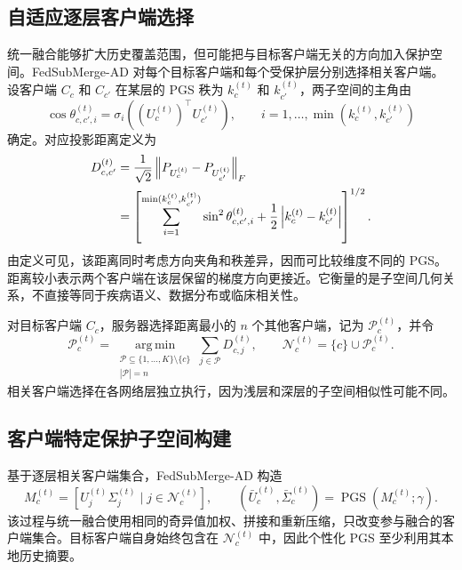 \subsection{自适应逐层客户端选择}
\label{subsec:fedsubmerge-adaptive-selection}

统一融合能够扩大历史覆盖范围，但可能把与目标客户端无关的方向加入保护空间。FedSubMerge-AD 对每个目标客户端和每个受保护层分别选择相关客户端。设客户端 $C_c$ 和 $C_{c'}$ 在某层的 PGS 秩为 $k_c^{(t)}$ 和 $k_{c'}^{(t)}$，两子空间的主角由
\begin{equation}
\cos\theta_{c,c',i}^{(t)}
=
\sigma_i\!\left((U_c^{(t)})^{\top}U_{c'}^{(t)}\right),
\qquad
 i=1,\ldots,\min(k_c^{(t)},k_{c'}^{(t)})
\label{eq:fedsubmerge-principal-angle}
\end{equation}
确定。对应投影距离定义为
\begin{align}
D_{c,c'}^{(t)}
&=
\frac{1}{\sqrt{2}}
\left\|P_{U_c^{(t)}}-P_{U_{c'}^{(t)}}\right\|_F
\notag\\
&=
\left[
\sum_{i=1}^{\min(k_c^{(t)},k_{c'}^{(t)})}
\sin^2\theta_{c,c',i}^{(t)}
+
\frac{1}{2}\left|k_c^{(t)}-k_{c'}^{(t)}\right|
\right]^{1/2}.
\label{eq:fedsubmerge-subspace-distance}
\end{align}
由定义可见，该距离同时考虑方向夹角和秩差异，因而可比较维度不同的 PGS。距离较小表示两个客户端在该层保留的梯度方向更接近。它衡量的是子空间几何关系，不直接等同于疾病语义、数据分布或临床相关性。

对目标客户端 $C_c$，服务器选择距离最小的 $n$ 个其他客户端，记为 $\mathcal{P}_c^{(t)}$，并令
\begin{equation}
\mathcal{P}_c^{(t)}
=
\operatorname*{arg\,min}_{
\substack{\mathcal{P}\subseteq\{1,\ldots,K\}\setminus\{c\}\\|\mathcal{P}|=n}}
\sum_{j\in\mathcal{P}}D_{c,j}^{(t)},
\qquad
\mathcal{N}_c^{(t)}=\{c\}\cup\mathcal{P}_c^{(t)}.
\label{eq:fedsubmerge-neighbor-set}
\end{equation}
相关客户端选择在各网络层独立执行，因为浅层和深层的子空间相似性可能不同。

\subsection{客户端特定保护子空间构建}
\label{subsec:fedsubmerge-personalized-subspace}

基于逐层相关客户端集合，FedSubMerge-AD 构造
\begin{equation}
M_c^{(t)}
=
\left[
U_j^{(t)}\Sigma_j^{(t)}\mid j\in\mathcal{N}_c^{(t)}
\right],
\qquad
(\bar U_c^{(t)},\bar\Sigma_c^{(t)})
=
\operatorname{PGS}\!\left(M_c^{(t)};\gamma\right).
\label{eq:fedsubmerge-personalized-merge}
\end{equation}
该过程与统一融合使用相同的奇异值加权、拼接和重新压缩，只改变参与融合的客户端集合。目标客户端自身始终包含在 $\mathcal{N}_c^{(t)}$ 中，因此个性化 PGS 至少利用其本地历史摘要。

